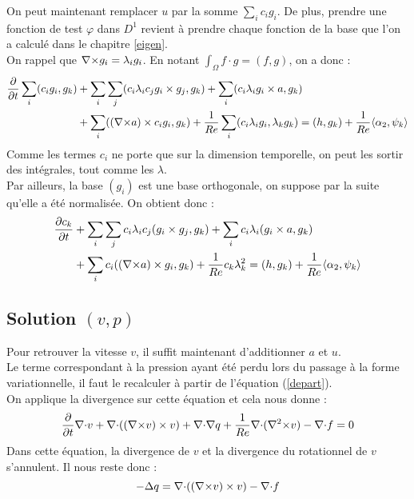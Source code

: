 On peut maintenant remplacer $u$ par la somme $\sum_ic_ig_i$. De plus, prendre une fonction de test $\varphi$ dans $D^1$ revient à prendre chaque fonction de la base que l'on a calculé dans le chapitre \ref{eigen}.\\
On rappel que ${\nabla\times} g_i=\lambda_ig_i$. En notant $\int_\Omega f\cdot g=(f,g)$, on a donc :
\begin{align*}
\frac{\partial}{\partial t}\sum_i (c_ig_i, g_k) &+ \sum_i\sum_j (c_i\lambda_ic_jg_i\times g_j,g_k) + \sum_i(c_i\lambda_ig_i\times a,g_k)\\
&+ \sum_i (({\nabla\times} a)\times c_ig_i,g_k) + \frac{1}{Re}\sum_i(c_i\lambda_ig_i, \lambda_kg_k) = (h,g_k) + \frac{1}{Re}\langle\alpha_2,\psi_k\rangle
\end{align*}
Comme les termes $c_i$ ne porte que sur la dimension temporelle, on peut les sortir des intégrales, tout comme les $\lambda$.\\
Par ailleurs, la base $(g_i)$ est une base orthogonale, on suppose par la suite qu'elle a été normalisée. On obtient donc :
\begin{eqnarray}
\label{fvspec}
\begin{aligned}
\frac{\partial c_k}{\partial t} &+ \sum_i\sum_j c_i\lambda_i c_j(g_i\times g_j, g_k) + \sum_i c_i\lambda_i(g_i\times a,g_k)\\
&+ \sum_i c_i(({\nabla\times} a)\times g_i, g_k) + \frac{1}{Re}c_k\lambda_k^2 = (h,g_k) + \frac{1}{Re}\langle\alpha_2,\psi_k\rangle
\end{aligned}
\end{eqnarray}
 
\subsection{Solution $(v,p)$}
\label{pression}

Pour retrouver la vitesse $v$, il suffit maintenant d'additionner $a$ et $u$.\\
Le terme correspondant à la pression ayant été perdu lors du passage à la forme variationnelle, il faut le recalculer à partir de l'équation (\ref{depart}).\\

On applique la divergence sur cette équation et cela nous donne :
\[
\frac{\partial}{\partial t}{\nabla\cdot} v + {\nabla\cdot}(({\nabla\times} v)\times v) + {\nabla\cdot}{\nabla} q + \frac{1}{Re}{\nabla\cdot}({\nabla^2\times} v) - {\nabla\cdot} f = 0
\]
Dans cette équation, la divergence de $v$ et la divergence du rotationnel de $v$ s'annulent. Il nous reste donc :
\[
-{\Delta} q = {\nabla\cdot}(({\nabla\times} v)\times v) - {\nabla\cdot} f
\]

